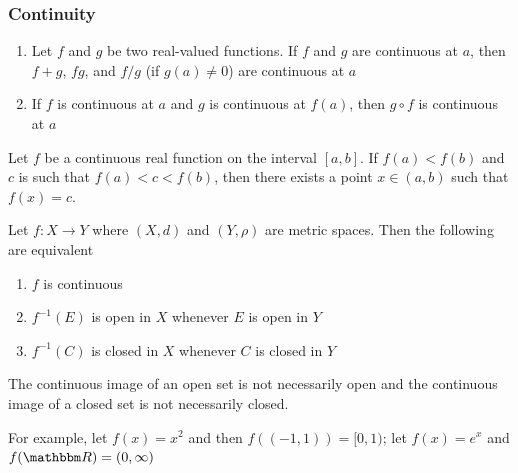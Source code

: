 \documentclass[9pt,aspectratio=169]{beamer}
\newcommand{\RR}{\mathbbm R}
\begin{document}
\begin{frame}[allowframebreaks]
    \frametitle{Continuity}
    \begin{theorem}
        \begin{enumerate}
            \item Let $f$ and $g$ be two real-valued functions. If $f$ and
            $g$ are continuous at $a$, then $f + g$, $fg$, and $f/g$ (if
            $g(a) \neq 0$) are continuous at $a$
            \item If $f$ is continuous at $a$ and $g$ is continuous at
            $f(a)$, then $g \circ f$ is continuous at $a$
        \end{enumerate}
    \end{theorem}
    \begin{theorem}
        Let $f$ be a continuous real function on the interval $[a, b]$. If
        $f(a) < f(b)$ and $c$ is such that $f(a) < c < f(b)$, then there
        exists a point $x \in (a, b)$ such that $f(x) = c$.
    \end{theorem}
    \framebreak
    \begin{theorem}
        Let $f: X \to Y$ where $(X, d)$ and $(Y, \rho)$ are metric spaces.
        Then the following are equivalent
        \begin{enumerate}
            \item $f$ is continuous
            \item $f^{-1}(E)$ is open in $X$ whenever $E$ is open in $Y$
            \item $f^{-1}(C)$ is closed in $X$ whenever $C$ is closed in $Y$
        \end{enumerate}
    \end{theorem}
    The continuous image of an open set is not necessarily open and the
    continuous image of a closed set is not necessarily closed.

    For example, let $f(x) = x^2$ and then $f((-1, 1)) = [0, 1)$; let $f(x) =
    e^x$ and $f(\RR) = (0, \infty)$
\end{frame}
\end{document}
